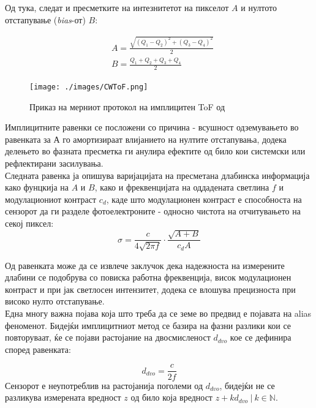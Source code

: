 \documentclass[11pt]{article}
\begin{document}
		  Од тука, следат и пресметките на интезнитетот на пикселот $A$ и нултото отстапување (\textit{bias}-от) $B$:

      \begin{align}
        & A = \frac{\sqrt{(Q_1 - Q_2)^2  + (Q_3 - Q_4)^2}}{2} \nonumber \\
  		  & B = \frac{Q_1 + Q_2 + Q_3 + Q_4}{2}
      \end{align}

		  \begin{figure}[H]
			  \texttt{[image: ./images/CWToF.png]}
			  \centering
			  \caption{Приказ на мерниот протокол на имплицитен ToF од \cite{tofwhitepaper}}
			  \label{fig:CWToF.png}
			\end{figure}

		    Имплицитните равенки се посложени со причина - всушност одземувањето во равенката за А го амортизираат влијанието на нултите отстапувања, додека делењето во фазната пресметка ги анулира ефектите од било кои системски или рефлектирани засилувања.\\ %
		    Следната равенка ја опишува варијацијата на пресметана длабинска информација како фунцкија на $A$ и $B$, како и фреквенцијата на оддадената светлина $f$ и модулациониот контраст $c_d$, каде што модулационен контраст е способноста на сензорот да ги разделе фотоелектроните - односно чистота на отчитувањето на секој пиксел:
        \begin{equation}
		       \sigma = \frac{c}{4\sqrt{2\pi f}} \cdot \frac{\sqrt{A+B}}{c_d A}
        \end{equation}

        Од равенката може да се извлече заклучок дека надежноста на измерените длабини се подобрува со повиска работна фреквенција, висок модулационен контраст и при јак светлосен интензитет, додека се влошува прецизноста при високо нулто отстапување.
		    \\
		    Една многу важна појава која што треба да се земе во предвид е појавата на alias феноменот. Бидејќи имплицитниот метод се базира на фазни разлики кои се повторуваат, ќе се појави растојание на двосмисленост $d_{dvo}$ кое се дефинира според равенката:

		    \begin{equation}
          d_{dvo} = \frac{c}{2f}
        \end{equation}
		    Сензорот е неупотреблив на растојанија поголеми од $d_{dvo}$, бидејќи не се разликува измерената вредност $z$ од било која вредност $z + k d_{dvo}\ | \ k \in \mathbb{N}$.
  \newpage
\end{document}
